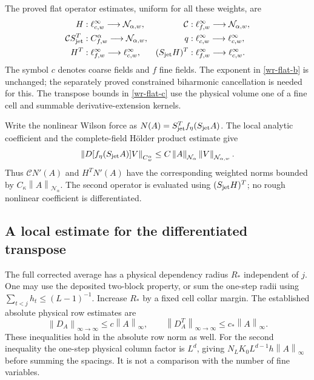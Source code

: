 \documentclass[11pt]{article}
\theoremstyle{remark}\newtheorem{remark}[theorem]{Remark}
\newcommand{\norm}[1]{\left\lVert#1\right\rVert}
\begin{document}
The proved flat operator estimates, uniform for all these weights,
are
\begin{align}
 H &: \ell^\infty_{c,w}\longrightarrow\mathcal N_{\alpha,w},&
 \mathcal C &: \ell^\infty_{f,w}\longrightarrow\mathcal N_{\alpha,w},
                                                       \label{wr-flat-a}\\
 \mathcal C S_{\rm jet}^T &: C^\alpha_{f,w}\longrightarrow\mathcal N_{\alpha,w},
 &q &: \ell^\infty_{c,w}\longrightarrow\ell^\infty_{c,w},
                                                       \label{wr-flat-b}\\
 H^T &: \ell^\infty_{f,w}\longrightarrow\ell^\infty_{c,w},&
 (S_{\rm jet}H)^T &: \ell^\infty_{f,w}\longrightarrow\ell^\infty_{c,w}.
                                                       \label{wr-flat-c}
\end{align}
The symbol $c$ denotes coarse fields and $f$ fine fields.
The exponent in \eqref{wr-flat-b} is unchanged; the separately
proved constrained biharmonic cancellation is needed for this.
The transpose bounds in \eqref{wr-flat-c} use the physical volume
one of a fine cell and summable derivative-extension kernels.

Write the nonlinear Wilson force as
$N(A)=S_{\rm jet}^Tf_\eta(S_{\rm jet}A)$. The local analytic
coefficient and the complete-field H\"older product estimate give
\begin{equation}\label{wr-force}
 \norm{D[f_\eta(S_{\rm jet}A)]V}_{C^\alpha_w}
 \le C\norm{A}_{\mathcal N_\alpha}
                   \norm{V}_{\mathcal N_{\alpha,w}}.
\end{equation}
Thus $\mathcal C N'(A)$ and $H^TN'(A)$ have the corresponding
weighted norms bounded by $C_\kappa\norm{A}_{\mathcal N_\alpha}$.
The second operator is evaluated using $(S_{\rm jet}H)^T$;
no rough nonlinear coefficient is differentiated.

\subsection{A local estimate for the differentiated transpose}
\label{wr-local-transpose}

The full corrected average has a physical dependency radius
$R_*$ independent of $j$. One may use the deposited two-block
property, or sum the one-step radii using
$\sum_{t<j}h_t\le(L-1)^{-1}$. Increase $R_*$ by a fixed cell
collar margin. The established absolute physical row estimates are
\begin{equation}\label{wr-row-estimates}
 \norm{D_A}_{\infty\to\infty}\le c\norm{A}_\infty,
 \qquad
 \norm{D_A^T}_{\infty\to\infty}\le c_*\norm{A}_\infty.
\end{equation}
These inequalities hold in the absolute row norm as well.
For the second inequality the one-step physical column factor
is $L^d$, giving
$N_LK_0L^{d-1}h\norm{A}_\infty$ before summing the spacings.
It is not a comparison with the number of fine variables.
\end{document}
